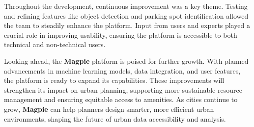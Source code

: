 Throughout the development, continuous improvement was a key theme. Testing and refining features like object detection and parking spot identification allowed the team to steadily enhance the platform. Input from users and experts played a crucial role in improving usability, ensuring the platform is accessible to both technical and non{-}technical users.

Looking ahead, the \textbf{Magpie} platform is poised for further growth. With planned advancements in machine learning models, data integration, and user features, the platform is ready to expand its capabilities. These improvements will strengthen its impact on urban planning, supporting more sustainable resource management and ensuring equitable access to amenities. As cities continue to grow, \textbf{Magpie} can help planners design smarter, more efficient urban environments, shaping the future of urban data accessibility and analysis.

\newpage{}